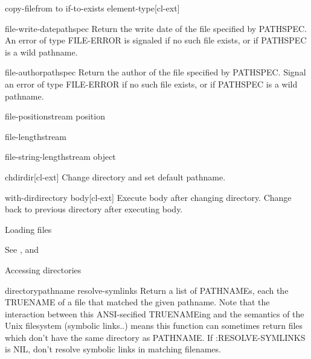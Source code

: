 \documentclass[10pt,english]{book}
\begin{document}
\begin{function}{copy-file}{from to \key if-to-exists element-type}[cl-ext]
  
\end{function}

\begin{function}{file-write-date}{pathspec}
  Return the write date of the file specified by PATHSPEC.
An error of type FILE-ERROR is signaled if no such file exists,
or if PATHSPEC is a wild pathname.
\end{function}

\begin{function}{file-author}{pathspec}
  Return the author of the file specified by PATHSPEC. Signal an
error of type FILE-ERROR if no such file exists, or if PATHSPEC
is a wild pathname.
\end{function}

\begin{function}{file-position}{stream \op position}
  
\end{function}

\begin{function}{file-length}{stream}
  
\end{function}

\begin{function}{file-string-length}{stream object}
  
\end{function}

\begin{function}{chdir}{dir}[cl-ext]
  Change directory and set default pathname.
\end{function}

\begin{macro}{with-dir}{directory \body body}[cl-ext]
  Execute body after changing directory. Change back to previous
  directory after executing body.
\end{macro}

Loading files

See ,  and

Accessing directories

\begin{function}{directory}{pathname \key resolve-symlinks}
  Return a list of PATHNAMEs, each the TRUENAME of a file that matched the
   given pathname. Note that the interaction between this ANSI-secified
   TRUENAMEing and the semantics of the Unix filesystem (symbolic links..)
   means this function can sometimes return files which don't have the same
   directory as PATHNAME.  If :RESOLVE-SYMLINKS is NIL, don't resolve
   symbolic links in matching filenames.
\end{function}
\end{document}
